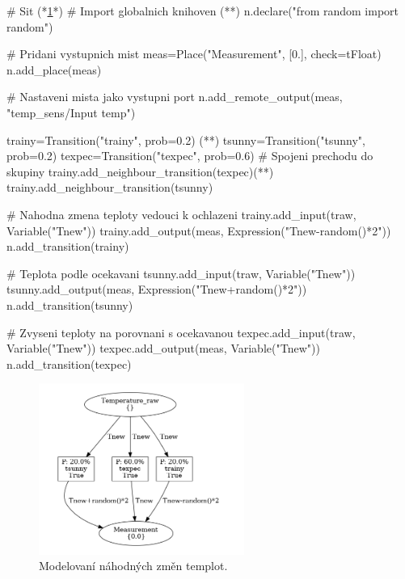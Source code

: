 \begin{python}
  # Sit (*\ref{prob-ev-viz}*)
  # Import globalnich knihoven (*\label{code:prob-ev-draw}*)
  n.declare("from random import random")

  # Pridani vystupnich mist
  meas=Place("Measurement", [0.], check=tFloat)
  n.add_place(meas)

  # Nastaveni mista jako vystupni port
  n.add_remote_output(meas, "temp_sens/Input temp")

  trainy=Transition("trainy", prob=0.2) (*\label{code:prob-temp-example}*)
  tsunny=Transition("tsunny", prob=0.2)
  texpec=Transition("texpec", prob=0.6)
  # Spojeni prechodu do skupiny
  trainy.add_neighbour_transition(texpec)(*\label{code:prob-temp-neghb-example}*)
  trainy.add_neighbour_transition(tsunny)

  # Nahodna zmena teploty vedouci k ochlazeni
  trainy.add_input(traw, Variable("Tnew"))
  trainy.add_output(meas, Expression("Tnew-random()*2"))
  n.add_transition(trainy)

  # Teplota podle ocekavani
  tsunny.add_input(traw, Variable("Tnew"))
  tsunny.add_output(meas, Expression("Tnew+random()*2"))
  n.add_transition(tsunny)

  # Zvyseni teploty na porovnani s ocekavanou
  texpec.add_input(traw, Variable("Tnew"))
  texpec.add_output(meas, Variable("Tnew"))
  n.add_transition(texpec)
\end{python}

\begin{figure}[htb]
  \centering
  \includegraphics[width=0.6\textwidth]{obrazky-figures/measure.png}
  \caption{Modelovaní náhodných změn templot.}
  \label{prob-ev-viz}
\end{figure}

